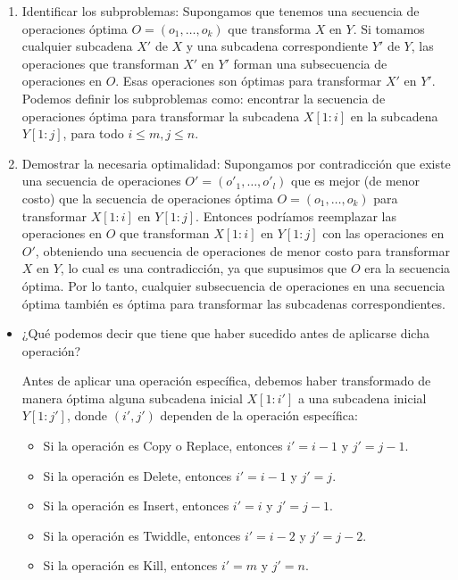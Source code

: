 \begin{problema}
\begin{enumerate}
\begin{sol}
\begin{enumerate}
            \item Identificar los subproblemas: Supongamos que tenemos una secuencia de operaciones óptima $O = \left(o_{1}, \ldots, o_{k}\right)$ que transforma $X$ en $Y$. Si tomamos cualquier subcadena $X'$ de $X$ y una subcadena correspondiente $Y'$ de $Y$, las operaciones que transforman $X'$ en $Y'$ forman una subsecuencia de operaciones en $O$. Esas operaciones son óptimas para transformar $X'$ en $Y'$. Podemos definir los subproblemas como: encontrar la secuencia de operaciones óptima para transformar la subcadena $X[1:i]$ en la subcadena $Y[1:j]$, para todo $i \leq m, j \leq n$.
            
            \item Demostrar la necesaria optimalidad: Supongamos por contradicción que existe una secuencia de operaciones $O' = \left(o'_{1}, \ldots, o'_{l}\right)$ que es mejor (de menor costo) que la secuencia de operaciones óptima $O = \left(o_{1}, \ldots, o_{k}\right)$ para transformar $X[1:i]$ en $Y[1:j]$. Entonces podríamos reemplazar las operaciones en $O$ que transforman $X[1:i]$ en $Y[1:j]$ con las operaciones en $O'$, obteniendo una secuencia de operaciones de menor costo para transformar $X$ en $Y$, lo cual es una contradicción, ya que supusimos que $O$ era la secuencia óptima. Por lo tanto, cualquier subsecuencia de operaciones en una secuencia óptima también es óptima para transformar las subcadenas correspondientes.
        \end{enumerate}

        \begin{itemize}
            \item ¿Qué podemos decir que tiene que haber sucedido antes de aplicarse dicha operación?

            Antes de aplicar una operación específica, debemos haber transformado de manera óptima alguna subcadena inicial $X[1:i']$ a una subcadena inicial $Y[1:j']$, donde $(i', j')$ dependen de la operación específica:
            \begin{itemize}
                \item Si la operación es Copy o Replace, entonces $i' = i - 1$ y $j' = j - 1$.
                \item Si la operación es Delete, entonces $i' = i - 1$ y $j' = j$.
                \item Si la operación es Insert, entonces $i' = i$ y $j' = j - 1$.
                \item Si la operación es Twiddle, entonces $i' = i - 2$ y $j' = j - 2$.
                \item Si la operación es Kill, entonces $i' = m$ y $j' = n$.
             

\end{itemize}
\end{itemize}
\end{sol}
\end{enumerate}
\end{problema}
